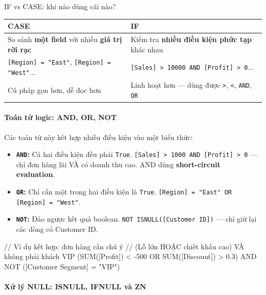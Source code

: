 \documentclass[12pt]{article}
\begin{document}
\begin{guidelinebox}{IF vs CASE: khi nào dùng cái nào?}
\renewcommand{\arraystretch}{1.3}
\begin{tabularx}{\linewidth}{X X}
\toprule
\textbf{CASE} & \textbf{IF} \\
\midrule
So sánh \textbf{một field} với nhiều \textbf{giá trị rời rạc} & Kiểm tra \textbf{nhiều điều kiện phức tạp} khác nhau \\
\texttt{[Region] = "East"}, \texttt{[Region] = "West"}... & \texttt{[Sales] > 10000 AND [Profit] > 0}... \\
Cú pháp gọn hơn, dễ đọc hơn & Linh hoạt hơn --- dùng được \texttt{>}, \texttt{<}, \texttt{AND}, \texttt{OR} \\
\bottomrule
\end{tabularx}
\end{guidelinebox}

\paragraph{Toán tử logic: AND, OR, NOT}

\noindent Các toán tử này kết hợp nhiều điều kiện vào một biểu thức:

\begin{itemize}
    \item \textbf{\texttt{AND}:} Cả hai điều kiện đều phải \texttt{True}. \texttt{[Sales] > 1000 AND [Profit] > 0} --- chỉ đơn hàng lãi VÀ có doanh thu cao. AND dùng \textbf{short-circuit evaluation}.

    \item \textbf{\texttt{OR}:} Chỉ cần một trong hai điều kiện là \texttt{True}. \texttt{[Region] = "East" OR [Region] = "West"}.

    \item \textbf{\texttt{NOT}:} Đảo ngược kết quả boolean. \texttt{NOT ISNULL([Customer ID])} --- chỉ giữ lại các dòng có Customer ID.
\end{itemize}

\begin{aivncodebox}[]
\begin{python}
// Ví dụ kết hợp: đơn hàng cần chú ý
// (Lỗ lớn HOẶC chiết khấu cao) VÀ không phải khách VIP
(SUM([Profit]) < -500 OR SUM([Discount]) > 0.3)
AND NOT ([Customer Segment] = "VIP")
\end{python}
\end{aivncodebox}

\paragraph{Xử lý NULL: ISNULL, IFNULL và ZN}
\end{document}

